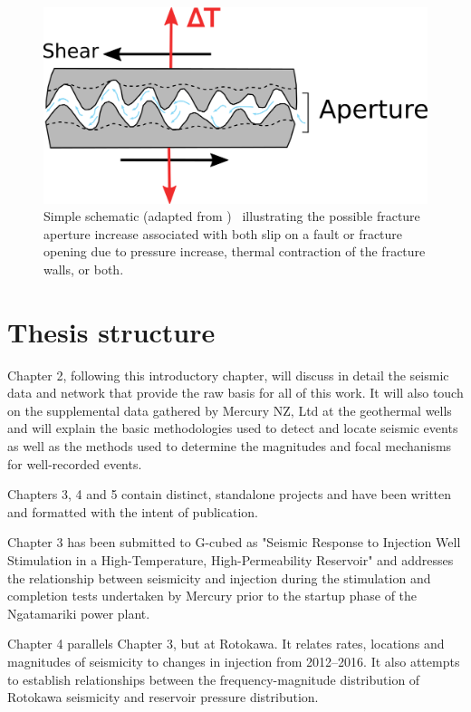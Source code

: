 \begin{figure}[h!]
\begin{center}
\includegraphics[width=0.70\columnwidth]{Chapter_1_Intro/figures/simple_stim_fig/simple_stim_fig_original}
\caption{{Simple schematic (adapted from \protect\citet{Fang_2017})~ illustrating the
possible fracture aperture increase associated with both slip on a fault
or fracture opening due to pressure increase, thermal contraction of the
fracture walls, or both.
{\label{363218}}%
}}
\end{center}
\end{figure}

\section{Thesis structure}
Chapter 2, following this introductory chapter, will discuss in detail the seismic data and network that provide the raw basis for all of this work. It will also touch on the supplemental data gathered by Mercury NZ, Ltd at the geothermal wells and will explain the basic methodologies used to detect and locate seismic events as well as the methods used to determine the magnitudes and focal mechanisms for well-recorded events.

Chapters 3, 4 and 5 contain distinct, standalone projects and have been written and formatted with the intent of publication.

Chapter 3 has been submitted to G-cubed as "Seismic Response to Injection Well Stimulation in a High-Temperature, High-Permeability Reservoir" and addresses the relationship between seismicity and injection during the stimulation and completion tests undertaken by Mercury prior to the startup phase of the Ngatamariki power plant.

Chapter 4 parallels Chapter 3, but at Rotokawa. It relates rates, locations and magnitudes of seismicity to changes in injection from 2012--2016. It also attempts to establish relationships between the frequency-magnitude distribution of Rotokawa seismicity and reservoir pressure distribution.

